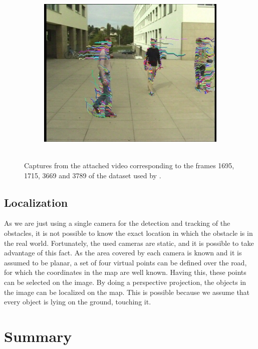 \begin{figure}[t]
        ~
        \begin{subfigure}[b]{0.24\textwidth}
                \centering
                \includegraphics[width=\textwidth, trim=6 0 5 1, clip]{fig8.jpg}
                \caption{~}
                \label{fig:cp02_videoCapture4}
        \end{subfigure}%
        \caption{Captures from the attached video corresponding to the frames 1695, 1715, 3669 and 3789 of the dataset used by \cite{berclaz2011multiple}.}\label{fig:cp02_videoCaptures}
\end{figure}

\subsection{Localization}\label{ch:chapter02_01_03}

As we are just using a single camera for the detection and tracking of the obstacles, it is not possible to know the exact location in which the obstacle is in the real world. Fortunately, the used cameras are static, and it is possible to take advantage of this fact. As the area covered by each camera is known and it is assumed to be planar, a set of four virtual points can be defined over the road, for which the coordinates in the map are well known.
Having this, these points can be selected on the image. By doing a perspective projection, the objects in the image can be localized on the map. This is possible because we assume that every object is lying on the ground, touching it.

\section{Summary}\label{ch:chapter02_03}

